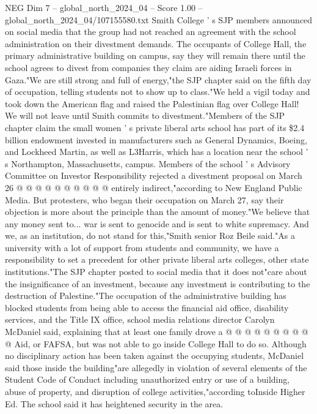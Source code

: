 \begin{textsample}{NEG Dim 7 – global\_north\_2024\_04 – Score 1.00 – global\_north\_2024\_04/107155580.txt}  \label{ex:f7_neg_393}
Smith College ' s SJP members announced on social media that the group had not reached an agreement with the school administration on their divestment demands.
The occupants of College Hall, the primary administrative building on campus, say they will remain there until the school agrees to divest from companies they claim are aiding Israeli forces in Gaza."We are still strong and full of energy,"the SJP chapter said on the fifth day of occupation, telling students not to show up to class."We held a vigil today and took down the American flag and raised the Palestinian flag over College Hall!
We will not leave until Smith commits to divestment."Members of the SJP chapter claim the small women ' s private liberal arts school has part of its \$2.4 billion endowment invested in manufacturers such as General Dynamics, Boeing, and Lockheed Martin, as well as L3Harris, which has a location near the school ' s Northampton, Massachusetts, campus.
Members of the school ' s Advisory Committee on Investor Responsibility rejected a divestment proposal on March 26 @ @ @ @ @ @ @ @ @ @ entirely indirect,"according to New England Public Media.
But protesters, who began their occupation on March 27, say their objection is more about the principle than the amount of money."We believe that any money sent to... war is sent to genocide and is sent to white supremacy.
And we, as an institution, do not stand for this,"Smith senior Roz Beile said."As a university with a lot of support from students and community, we have a responsibility to set a precedent for other private liberal arts colleges, other state institutions."The SJP chapter posted to social media that it does not"care about the insignificance of an investment, because any investment is contributing to the destruction of Palestine."The occupation of the administrative building has blocked students from being able to access the financial aid office, disability services, and the Title IX office, school media relations director Carolyn McDaniel said, explaining that at least one family drove a @ @ @ @ @ @ @ @ @ @ Aid, or FAFSA, but was not able to go inside College Hall to do so.
Although no disciplinary action has been taken against the occupying students, McDaniel said those inside the building"are allegedly in violation of several elements of the Student Code of Conduct including unauthorized entry or use of a building, abuse of property, and disruption of college activities,"according toInside Higher Ed.
The school said it has heightened security in the area.

\end{textsample}
